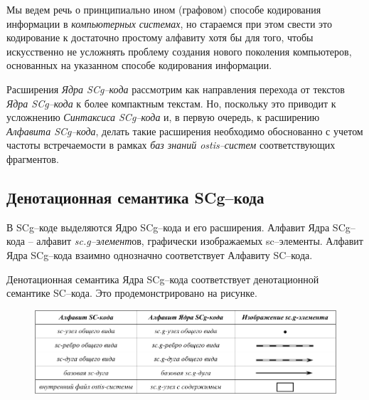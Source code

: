 Мы ведем речь о принципиально ином (графовом) способе кодирования информации в \textit{компьютерных системах}, но стараемся при этом свести это кодирование к достаточно простому алфавиту хотя бы для того, чтобы искусственно не усложнять проблему создания нового поколения компьютеров, основанных на указанном способе кодирования информации. 

Расширения \textit{Ядра SCg--кода} рассмотрим как направления перехода от текстов \textit{Ядра SCg--кода} к более компактным текстам. Но, поскольку это приводит к усложнению \textit{Синтаксиса SCg--кода} и, в первую очередь, к расширению \textit{Алфавита SCg--кода}, делать такие расширения необходимо обоснованно с учетом частоты встречаемости в рамках \textit{баз знаний ostis--систем} соответствующих фрагментов.


\subsection{Денотационная семантика SCg--кода}

В SCg--коде выделяются Ядро SCg--кода и его расширения. 
Алфавит Ядра SCg--кода -- алфавит  \textit{sc.g--элемент}ов, графически изображаемых sc--элементы. Алфавит Ядра SCg--кода взаимно однозначно соответствует Алфавиту SC--кода.

Денотационная семантика Ядра SCg--кода соответствует денотационной семантике SC--кода. Это продемонстрировано на рисунке.


\begin{figure}[h]
	\centering
	\includegraphics[scale=0.8]{images/intro/scg/SCg-core-alphabet.pdf}
\end{figure}


